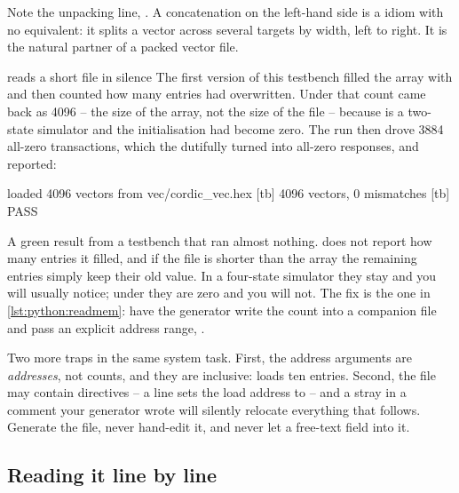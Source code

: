 
Note the unpacking line, . A
concatenation on the left-hand side is a \SV{} idiom with no \VHDL{}
equivalent: it splits a vector across several targets by width, left to
right. It is the natural partner of a packed vector file.

\begin{gotcha}{ reads a short file in silence}
The first version of this testbench filled the array with  and then
counted how many entries  had overwritten. Under
 that count came back as 4096 -- the size of the array, not
the size of the file -- because  is a two-state simulator and
the  initialisation had become zero. The run then drove 3884
all-zero transactions, which the \DUT dutifully turned into all-zero
responses, and reported:

\begin{txtcode}
[tb] loaded 4096 vectors from vec/cordic_vec.hex
[tb] 4096 vectors, 0 mismatches
[tb] PASS
\end{txtcode}

A green result from a testbench that ran almost nothing. 
does not report how many entries it filled, and if the file is shorter than
the array the remaining entries simply keep their old value. In a four-state
simulator they stay  and you will usually notice; under
 they are zero and you will not. The fix is the one in
\cref{lst:python:readmem}: have the generator write the count into a
companion file and pass an explicit address range,
.
\end{gotcha}

Two more traps in the same system task. First, the address arguments are
\emph{addresses}, not counts, and they are inclusive:  loads ten entries. Second, the file may contain  directives --
a line  sets the load address to  -- and a stray
 in a comment your generator wrote will silently relocate everything
that follows. Generate the file, never hand-edit it, and never let a
free-text field into it.

\subsection{Reading it line by line}

